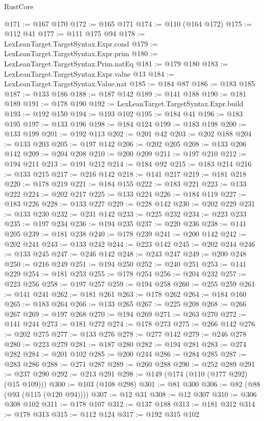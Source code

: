 \begin{lexlean}{RustCore}
\begin{coremodule}
@171 := @167 @170
@172 := @165 @171
@174 := @110 (@164 @172)
@175 := @112 @41
@177 := @111 @175 @94
@178 := LexLeanTarget.TargetSyntax.Expr.cond
@179 := LexLeanTarget.TargetSyntax.Expr.prim
@180 := LexLeanTarget.TargetSyntax.Prim.natEq
@181 := @179 @180
@183 := LexLeanTarget.TargetSyntax.Expr.value @13
@184 := LexLeanTarget.TargetSyntax.Value.nat
@185 := @184 @87
@186 := @183 @185
@187 := @133 @186
@188 := @187 @142
@189 := @141 @188
@190 := @181 @189
@191 := @178 @190
@192 := LexLeanTarget.TargetSyntax.Expr.build
@193 := @192 @150
@194 := @193 @102
@195 := @184 @41
@196 := @183 @195
@197 := @133 @196
@198 := @184 @124
@199 := @183 @198
@200 := @133 @199
@201 := @192 @113
@202 := @201 @42
@203 := @202 @188
@204 := @133 @203
@205 := @197 @142
@206 := @202 @205
@208 := @133 @206 @142
@209 := @204 @208
@210 := @200 @209
@211 := @197 @210
@212 := @194 @211
@213 := @191 @212
@214 := @184 @92
@215 := @183 @214
@216 := @133 @215
@217 := @216 @142
@218 := @141 @217
@219 := @181 @218
@220 := @178 @219
@221 := @184 @155
@222 := @183 @221
@223 := @133 @222
@224 := @202 @217
@225 := @133 @224
@226 := @184 @119
@227 := @183 @226
@228 := @133 @227
@229 := @228 @142
@230 := @202 @229
@231 := @133 @230
@232 := @231 @142
@233 := @225 @232
@234 := @223 @233
@235 := @197 @234
@236 := @194 @235
@237 := @220 @236
@238 := @141 @205
@239 := @181 @238
@240 := @178 @239
@241 := @200 @142
@242 := @202 @241
@243 := @133 @242
@244 := @223 @142
@245 := @202 @244
@246 := @133 @245
@247 := @246 @142
@248 := @243 @247
@249 := @200 @248
@250 := @216 @249
@251 := @194 @250
@252 := @240 @251
@253 := @141 @229
@254 := @181 @253
@255 := @178 @254
@256 := @204 @232
@257 := @223 @256
@258 := @197 @257
@259 := @194 @258
@260 := @255 @259
@261 := @141 @241
@262 := @181 @261
@263 := @178 @262
@264 := @184 @160
@265 := @183 @264
@266 := @133 @265
@267 := @225 @208
@268 := @266 @267
@269 := @197 @268
@270 := @194 @269
@271 := @263 @270
@272 := @141 @244
@273 := @181 @272
@274 := @178 @273
@275 := @266 @142
@276 := @202 @275
@277 := @133 @276
@278 := @277 @142
@279 := @246 @278
@280 := @223 @279
@281 := @187 @280
@282 := @194 @281
@283 := @274 @282
@284 := @201 @102
@285 := @200 @244
@286 := @284 @285
@287 := @283 @286
@288 := @271 @287
@289 := @260 @288
@290 := @252 @289
@291 := @237 @290
@292 := @213 @291
@298 := @149 (@174 (@110 (@177 @292) (@15 @109)))
@300 := @103 (@108 @298)
@301 := @81 @300
@306 := @82 (@88 (@93 (@115 (@120 @94))))
@307 := @12 @31
@308 := @12 @307
@310 := @306 @308 @102
@311 := @178 @107
@312 := @137 @188
@313 := @181 @312
@314 := @178 @313
@315 := @112 @124
@317 := @192 @315 @102

\end{coremodule}
\end{lexlean}
